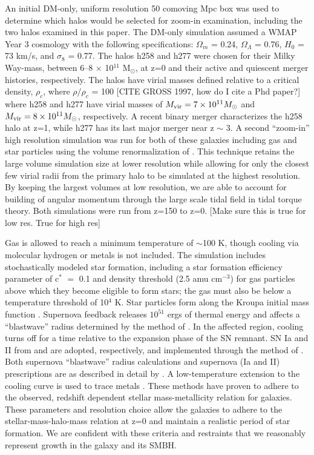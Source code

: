 \documentclass[manuscript]{aastex}
\begin{document}
An initial DM-only, uniform resolution 50 comoving Mpc box was used to determine which halos would be selected for zoom-in examination, including the two halos examined in this paper. The DM-only simulation assumed a WMAP Year 3 cosmology \citep{Spergel2007} with the following specifications: $\Omega _m$ = 0.24, $\Omega _{\Lambda}$ = 0.76, $H_0$ = 73 km/s, and $\sigma _8$ = 0.77. The halos h258 and h277  were chosen for their Milky Way-mass, between 6--8 $\times$ 10$^{11}$  M$_{\odot}$, at z=0 and their active and quiescent merger histories, respectively. The halos have virial masses defined relative to a critical density, $\rho _c$, where $\rho / \rho _c$ = 100 [CITE GROSS 1997, how do I cite a Phd paper?] where h258 and h277 have virial masses of $M_{\rm vir} = 7 \times 10^{11} M_{\odot}$ and $M_{\rm vir} = 8 \times 10^{11} M_{\odot}$, respectively. A recent binary merger characterizes the h258 halo at z=1, while h277 has its last major merger near z $\sim$ 3. A second ``zoom-in'' high resolution simulation was run for both of these galaxies including gas and star particles using the volume renormalization of \cite{Katz1993}. This technique retains the large volume simulation size at lower resolution while allowing for only the closest few virial radii from the primary halo to be simulated at the highest resolution. By keeping the largest volumes at low resolution, we are able to account for building of angular momentum through the large scale tidal field in tidal torque theory. Both simulations were run from z=150 to z=0.  [Make sure this is true for low res. True for high res]

Gas is allowed to reach a minimum temperature of $\sim$100 K, though cooling via molecular hydrogen or metals is not included. The simulation includes stochastically modeled star formation, including a star formation efficiency parameter of c$^*$ $=$ 0.1 and density threshold (2.5 amu cm$^{-3}$) for gas particles above which they become eligible to form stars; the gas must also be below a temperature threshold of 10$^4$ K. Star particles form along the Kroupa initial mass function \citep{Kroupa2001}. Supernova feedback releases $10^{51}$ ergs of thermal energy and affects a ``blastwave'' radius determined by the method of \cite{Ostriker1988}. In the affected region, cooling turns off for a time relative to the expansion phase of the SN remnant. SN Ia and II from \cite{Thielemann1986} and \cite{Woosley1986} are adopted, respectively, and implemented through the method of \cite{Raiteri1996}. Both supernova ``blastwave'' radius calculations and supernova (Ia and II) prescriptions are as described in detail by \cite{Stinson2006}. A low-temperature extension to the cooling curve is used to trace metals \citep{Bromm2001}. These methods have proven to adhere to the observed, redshift dependent stellar mass-metallicity relation for galaxies. \citep{Brooks2007,Maiolino2008} These parameters and resolution choice allow the galaxies to adhere to the stellar-mass-halo-mass relation at z=0 and maintain a realistic period of star formation. \citep{Moster2010,Munshi2013} We are confident with these criteria and restraints that we reasonably represent growth in the galaxy and its SMBH. 
\end{document}
